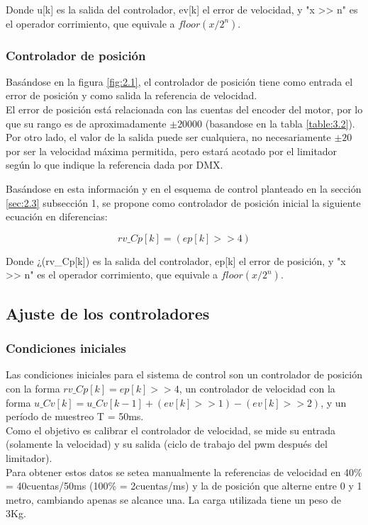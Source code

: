 Donde u[k] es la salida del controlador, ev[k] el error de velocidad, y "x >> n" es el operador corrimiento, que equivale a \(floor(x/2^n)\).

\subsubsection{Controlador de posición}
Basándose en la figura \ref{fig:2.1}, el controlador de posición tiene como entrada el error de posición y como salida la referencia de velocidad. \\
El error de posición está relacionada con las cuentas del encoder del motor, por lo que su rango es de aproximadamente \(\pm 20000\) (basandose en la tabla \ref{table:3.2}). Por otro lado, el valor de la salida puede ser cualquiera, no necesariamente \(\pm 20\) por ser la velocidad máxima permitida, pero estará acotado por el limitador según lo que indique la referencia dada por DMX.

Basándose en esta información y en el esquema de control planteado en la sección \ref{sec:2.3} subsección 1, se propone como controlador de posición inicial la siguiente ecuación en diferencias:

\[rv\_Cp[k] = (ep[k] >> 4)\]

Donde ¿(rv\_Cp[k]) es la salida del controlador, ep[k] el error de posición, y "x >> n" es el operador corrimiento, que equivale a \(floor(x/2^n)\).

\subsection{Ajuste de los controladores}


\subsubsection{Condiciones iniciales}
Las condiciones iniciales para el sistema de control son un controlador de posición con la forma \(rv\_Cp[k] = ep[k] >> 4\), un controlador de velocidad con la forma \(u\_Cv[k] = u\_Cv[k-1] + (ev[k] >> 1) - (ev[k] >> 2)\), y un período de muestreo T = 50ms.\\

Como el objetivo es calibrar el controlador de velocidad, se mide su entrada (solamente la velocidad) y su salida (ciclo de trabajo del pwm después del limitador). \\
Para obtener estos datos se setea manualmente la referencias de velocidad en 40\% = 40cuentas/50ms (100\% = 2cuentas/ms) y la de posición que alterne entre 0 y 1 metro, cambiando apenas se alcance una. La carga utilizada tiene un peso de 3Kg.

